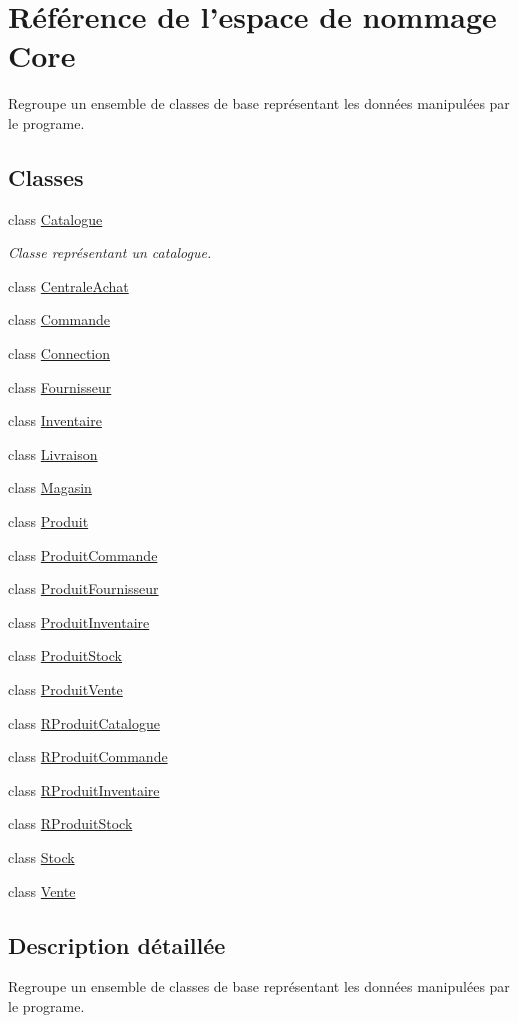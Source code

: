 \hypertarget{namespace_core}{
\section{Référence de l'espace de nommage Core}
\label{d0/d35/namespace_core}
}


Regroupe un ensemble de classes de base représentant les données manipulées par le programe.  


\subsection*{Classes}
\begin{DoxyCompactItemize}
\item 
class \hyperlink{class_core_1_1_catalogue}{Catalogue}
\begin{DoxyCompactList}\small\item\em Classe représentant un catalogue. \item\end{DoxyCompactList}\item 
class \hyperlink{class_core_1_1_centrale_achat}{CentraleAchat}
\item 
class \hyperlink{class_core_1_1_commande}{Commande}
\item 
class \hyperlink{class_core_1_1_connection}{Connection}
\item 
class \hyperlink{class_core_1_1_fournisseur}{Fournisseur}
\item 
class \hyperlink{class_core_1_1_inventaire}{Inventaire}
\item 
class \hyperlink{class_core_1_1_livraison}{Livraison}
\item 
class \hyperlink{class_core_1_1_magasin}{Magasin}
\item 
class \hyperlink{class_core_1_1_produit}{Produit}
\item 
class \hyperlink{class_core_1_1_produit_commande}{ProduitCommande}
\item 
class \hyperlink{class_core_1_1_produit_fournisseur}{ProduitFournisseur}
\item 
class \hyperlink{class_core_1_1_produit_inventaire}{ProduitInventaire}
\item 
class \hyperlink{class_core_1_1_produit_stock}{ProduitStock}
\item 
class \hyperlink{class_core_1_1_produit_vente}{ProduitVente}
\item 
class \hyperlink{class_core_1_1_r_produit_catalogue}{RProduitCatalogue}
\item 
class \hyperlink{class_core_1_1_r_produit_commande}{RProduitCommande}
\item 
class \hyperlink{class_core_1_1_r_produit_inventaire}{RProduitInventaire}
\item 
class \hyperlink{class_core_1_1_r_produit_stock}{RProduitStock}
\item 
class \hyperlink{class_core_1_1_stock}{Stock}
\item 
class \hyperlink{class_core_1_1_vente}{Vente}
\end{DoxyCompactItemize}


\subsection{Description détaillée}
Regroupe un ensemble de classes de base représentant les données manipulées par le programe. 